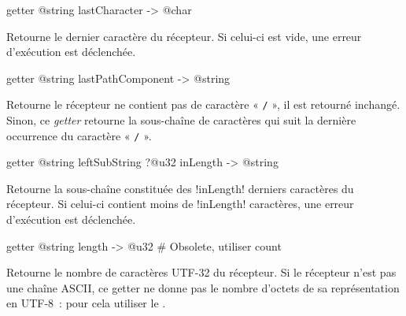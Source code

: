 
\begin{galgas4box}
getter @string lastCharacter -> @char
\end{galgas4box}

Retourne le dernier caractère du récepteur. Si celui-ci est vide, une erreur d'exécution est déclenchée.









\begin{galgas4box}
getter @string lastPathComponent -> @string
\end{galgas4box}

Retourne le récepteur ne contient pas de caractère « \texttt{/} », il est retourné inchangé. Sinon, ce \emph{getter} retourne la sous-chaîne de caractères qui suit la dernière occurrence du caractère « \texttt{/} ».









\begin{galgas4box}
getter @string leftSubString ?@u32 inLength -> @string
\end{galgas4box}

Retourne la sous-chaîne constituée des \ggsq!inLength! derniers caractères du récepteur. Si celui-ci contient moins de \ggsq!inLength! caractères, une erreur d'exécution est déclenchée.









\begin{galgas4box}
getter @string length -> @u32 # Obsolete, utiliser count
\end{galgas4box}

Retourne le nombre de caractères UTF-32 du récepteur. Si le récepteur n'est pas une chaîne ASCII, ce getter ne donne pas le nombre d'octets de sa représentation en UTF-8~: pour cela utiliser le .









